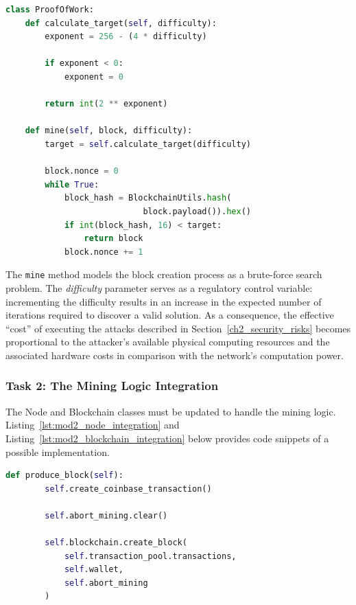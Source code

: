 \begin{lstlisting}[language=Python, caption=Proof of Work Mining Logic code snippet, label=lst:mod2_pow_class]
class ProofOfWork:
    def calculate_target(self, difficulty):
        exponent = 256 - (4 * difficulty)
        
        if exponent < 0:
            exponent = 0
            
        return int(2 ** exponent)

    def mine(self, block, difficulty):
        target = self.calculate_target(difficulty)

        block.nonce = 0
        while True:
            block_hash = BlockchainUtils.hash(
                            block.payload()).hex()
            if int(block_hash, 16) < target:
                return block
            block.nonce += 1
\end{lstlisting}

The \texttt{mine} method models the block creation process as a brute-force search problem. The \emph{difficulty} parameter serves as a regulatory control variable: incrementing the difficulty results in an increase in the expected number of iterations required to discover a valid solution. As a consequence, the effective \enquote{cost} of executing the attacks described in Section~\ref{ch2_security_risks} becomes proportional to the attacker’s available physical computing resources and the associated hardware costs in comparison with the network's computation power.

\subsubsection*{Task 2: The Mining Logic Integration}
The Node and Blockchain classes must be updated to handle the mining logic. Listing~\ref{lst:mod2_node_integration} and Listing~\ref{lst:mod2_blockchain_integration} below provides code snippets of a possible implementation.

\begin{lstlisting}[language=Python, caption=Code snippet of the produce\_block function, label=lst:mod2_node_integration]
    def produce_block(self):
        self.create_coinbase_transaction()
        
        self.abort_mining.clear()
        
        self.blockchain.create_block(
            self.transaction_pool.transactions, 
            self.wallet, 
            self.abort_mining
        )
\end{lstlisting}

